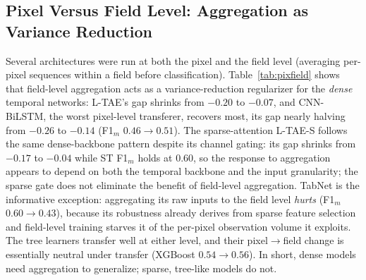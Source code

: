 \documentclass[preprint,authoryear]{elsarticle}
\begin{document}
\subsection{Pixel Versus Field Level: Aggregation as Variance Reduction}
\label{sec:pixfield}
Several architectures were run at both the pixel and the field level (averaging per-pixel sequences within a field before classification). Table~\ref{tab:pixfield} shows that field-level aggregation acts as a variance-reduction regularizer for the \emph{dense} temporal networks: L-TAE's gap shrinks from $-0.20$ to $-0.07$, and CNN-BiLSTM, the worst pixel-level transferer, recovers most, its gap nearly halving from $-0.26$ to $-0.14$ (F1$_m$ $0.46\rightarrow0.51$). The sparse-attention L-TAE-S follows the same dense-backbone pattern despite its channel gating: its gap shrinks from $-0.17$ to $-0.04$ while ST F1$_m$ holds at $0.60$, so the response to aggregation appears to depend on both the temporal backbone and the input granularity; the sparse gate does not eliminate the benefit of field-level aggregation. TabNet is the informative exception: aggregating its raw inputs to the field level \emph{hurts} (F1$_m$ $0.60\rightarrow0.43$), because its robustness already derives from sparse feature selection and field-level training starves it of the per-pixel observation volume it exploits. The tree learners transfer well at either level, and their pixel$\rightarrow$field change is essentially neutral under transfer (XGBoost $0.54\rightarrow0.56$). In short, dense models need aggregation to generalize; sparse, tree-like models do not.
\end{document}
